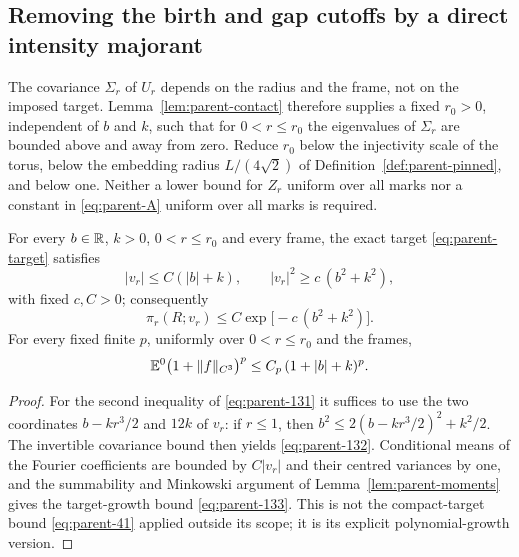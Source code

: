 \subsection{Removing the birth and gap cutoffs by a direct intensity majorant}\label{ssec:parent-majorant}

The covariance $\Sigma_r$ of $U_r$ depends on the radius and the frame, not on the imposed target. Lemma~\ref{lem:parent-contact} therefore supplies a fixed $r_0>0$, independent of $b$ and $k$, such that for $0<r\le r_0$ the eigenvalues of $\Sigma_r$ are bounded above and away from zero. Reduce $r_0$ below the injectivity scale of the torus, below the embedding radius $L/(4\sqrt2)$ of Definition~\ref{def:parent-pinned}, and below one. Neither a lower bound for $Z_r$ uniform over all marks nor a constant in \eqref{eq:parent-A} uniform over all marks is required.

\begin{lemma}\label{lem:parent-growth}
For every $b\in\mathbb R$, $k>0$, $0<r\le r_0$ and every frame, the exact target \eqref{eq:parent-target} satisfies
\begin{equation}\label{eq:parent-131}
|v_r|\le C(|b|+k),\qquad |v_r|^2\ge c\,(b^2+k^2),
\end{equation}
with fixed $c,C>0$; consequently
\begin{equation}\label{eq:parent-132}
\pi_r(R;v_r)\le C\exp\bigl[-c\,(b^2+k^2)\bigr].
\end{equation}
For every fixed finite $p$, uniformly over $0<r\le r_0$ and the frames,
\begin{equation}\label{eq:parent-133}
\mathbb E^0\bigl(1+\|f\|_{C^3}\bigr)^p\le C_p\,(1+|b|+k)^p .
\end{equation}
\end{lemma}

\begin{proof}
For the second inequality of \eqref{eq:parent-131} it suffices to use the two coordinates $b-kr^3/2$ and $12k$ of $v_r$: if $r\le1$, then $b^2\le2(b-kr^3/2)^2+k^2/2$. The invertible covariance bound then yields \eqref{eq:parent-132}. Conditional means of the Fourier coefficients are bounded by $C|v_r|$ and their centred variances by one, and the summability and Minkowski argument of Lemma~\ref{lem:parent-moments} gives the target-growth bound \eqref{eq:parent-133}. This is not the compact-target bound \eqref{eq:parent-41} applied outside its scope; it is its explicit polynomial-growth version.
\end{proof}

